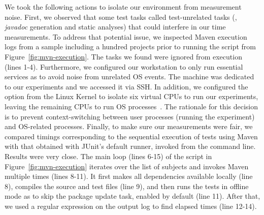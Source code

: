 \documentclass[10pt,journal,compsoc]{IEEEtran}
\begin{document}
We took the following actions to isolate our environment from
measurement noise.
First, we observed that some test tasks called test-unrelated tasks
(\eg, \emph{javadoc} generation and static analyses) that could
interfere in our time measurements.
To address that potential issue, we inspected Maven execution logs
from a sample including a hundred projects prior to running the script
from Figure~\ref{fig:mvn-execution}.
The tasks we found were ignored from execution (lines 1-4).
Furthermore, we configured
our workstation to only run essential services as to avoid noise from unrelated OS events.
The machine was dedicated to our experiments and we
accessed it via SSH. In addition, we configured the 
option from the Linux Kernel \cite{linux-kernel} to isolate six
virtual CPUs to run our experiments, leaving the remaining CPUs to run
OS processes~\cite{isolcpus-use}.  The rationale for this decision is
to prevent context-switching between user processes (running the
experiment) and OS-related processes.  Finally, to make sure our
measurements were fair, we compared timings corresponding to the
sequential execution of tests using Maven with that obtained with
JUnit's default  runner, invoked from the command
line.  Results were very close.
The main loop (lines 6-15) of the script in
Figure~\ref{fig:mvn-execution} iterates over the list of subjects and
invokes Maven multiple times (lines 8-11).  It first makes all dependencies available locally
(line 8), compiles the source and test files (line 9), and then runs
the tests in offline mode as to skip the package update task, enabled
by default (line 11). After that, we used a regular expression on
the output log to find elapsed times (line 12-14).


\end{document}
